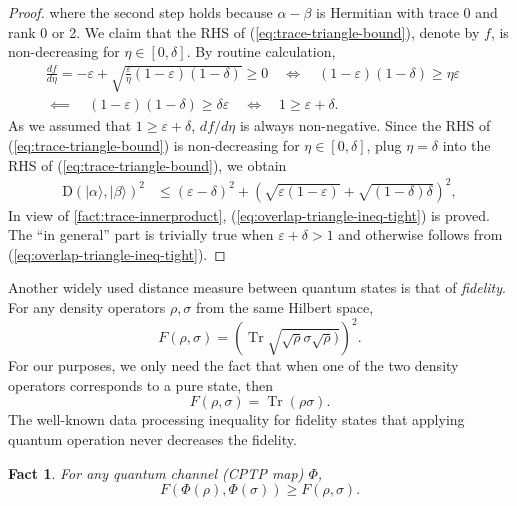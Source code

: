 \documentclass[10pt,a4paper]{article}
\newtheorem{fact}[theorem]{Fact}
\theoremstyle{remark}
\def\epsilon{\varepsilon}
\newcommand{\1}[1]{\mathds{1}{[#1]}}
\newcommand{\ket}[1]{\lvert #1\rangle}
\newcommand{\trace}{\operatorname{Tr}}
\newcommand{\TD}{\mathrm{D}}
\numberwithin{equation}{section}
\begin{document}
\begin{proof}
where the second step holds because $\alpha-\beta$ is Hermitian with trace 0 and rank 0 or 2.
We claim that the RHS of (\ref{eq:trace-triangle-bound}), denote by $f$, is non-decreasing for $\eta\in[0,\delta]$. 
By routine calculation, 
\begin{align*}
    \frac{d f}{d\eta}  = -\epsilon + \sqrt{ \frac{\epsilon}{\eta} (1-\epsilon)(1-\delta)} \ge 0 \quad
    \iff \quad(1-\epsilon)(1-\delta) \ge \eta\epsilon \quad
    \\
    \impliedby 
    \quad
    (1-\epsilon)(1-\delta) \ge \delta\epsilon
    \quad
    \iff \quad 1 \ge \epsilon + \delta.
\end{align*}
As we assumed that $1 \ge \epsilon+\delta$, $df/d\eta$ is always non-negative.
Since the RHS of (\ref{eq:trace-triangle-bound}) is non-decreasing for $\eta\in[0,\delta]$, plug $\eta=\delta$ into the RHS of (\ref{eq:trace-triangle-bound}), we obtain
\begin{align*}
    \TD(\ket\alpha,\ket\beta) ^2
    &\le (\epsilon-\delta)^2 + (\sqrt{\epsilon(1-\epsilon)}+\sqrt{(1-\delta)\delta})^2,
\end{align*}
In view of \cref{fact:trace-innerproduct}, (\ref{eq:overlap-triangle-ineq-tight}) is proved. The ``in general'' part is trivially true when $\epsilon+\delta>1$ and otherwise follows from (\ref{eq:overlap-triangle-ineq-tight}).
\end{proof}

Another widely used distance measure between quantum states is that of \emph{fidelity}. For any density operators $\rho, \sigma$ from the same Hilbert space,
\begin{equation*}
    F(\rho, \sigma) = \left(\trace \sqrt{\sqrt\rho \sigma \sqrt\rho)}\right)^2.
\end{equation*}
For our purposes, we only need the fact that when one of the two density operators corresponds to a pure state, then
\begin{equation*}
    F(\rho,\sigma) = \trace(\rho\sigma).
\end{equation*}
The well-known data processing inequality for fidelity states that applying quantum operation never decreases the fidelity. 
\begin{fact}\label{fact:data-processing}
For any quantum channel (CPTP map) $\Phi$,
    \[F(\Phi(\rho), \Phi(\sigma)) \ge F(\rho, \sigma).\]
\end{fact}
\end{document}
